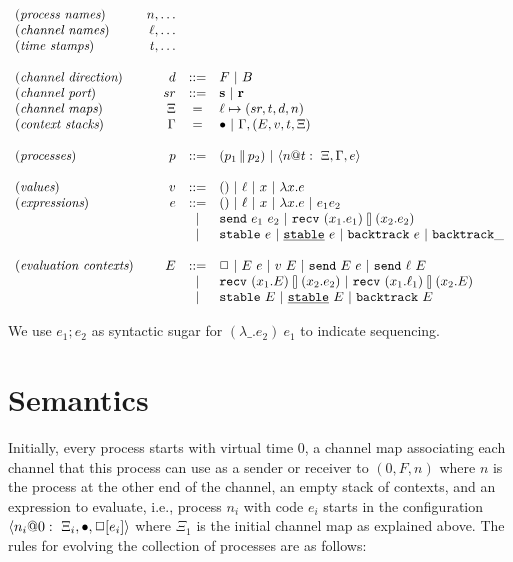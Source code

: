 \documentclass{article}
\begin{document}
\[\begin{array}{lrcl}
(\textit{process names}) & n, \ldots \\
(\textit{channel names}) & \ell, \ldots \\
(\textit{time stamps}) & t, \ldots \\
\\
(\textit{channel direction}) & d &::=& F \alt B \\
(\textit{channel port}) & sr &::=& \textbf{s} \alt \textbf{r} \\
(\textit{channel maps}) & \Xi &=& \ell \mapsto (sr,t,d,n) \\
(\textit{context stacks}) & \Gamma &=& \bullet \alt \Gamma,(E,v,t,\Xi) \\
\\
(\textit{processes}) & p &::=& (\parc{p_1}{p_2}) \alt \proc{n}{\Gamma}{\Xi}{e}{t} \\
\\
(\textit{values}) & v &::=& () \alt \ell \alt x \alt \lambda x.e \\
(\textit{expressions}) & e &::=& () \alt \ell \alt x \alt \lambda x.e 
  \alt e_1e_2 \\
  &&\alt& \send{e_1}{e_2} \alt \recv{x_1}{e_1}{x_2}{e_2} \\
  &&\alt& \stable{e} \alt \stableu{e} \alt \backtrack{e} \alt \abacktrack \\
\\
(\textit{evaluation contexts}) & E &::=& \Box \alt E~e \alt v~E \alt 
  \send{E}{e} \alt \send{\ell}{E} \\
  &&\alt& \recv{x_1}{E}{x_2}{e_2} \alt \recv{x_1}{\ell_1}{x_2}{E} \\
  &&\alt& \stable{E} \alt \stableu{E} \alt \backtrack{E}
\end{array}\]

We use $e_1;e_2$ as syntactic sugar for $(\lambda \_.e_2)~e_1$ to indicate
sequencing.

\section{Semantics} 

Initially, every process starts with virtual time 0, a channel map
associating each channel that this process can use as a sender or receiver to
$(0,F,n)$ where $n$ is the process at the other end of the channel, an empty
stack of contexts, and an expression to evaluate, i.e., process $n_i$ with
code $e_i$ starts in the configuration
$\proc{n_i}{\bullet}{\Xi_i}{\Box[e_i]}{0}$ where $\Xi_1$ is the initial
channel map as explained above. The rules for evolving the collection of
processes are as follows:
\end{document}
